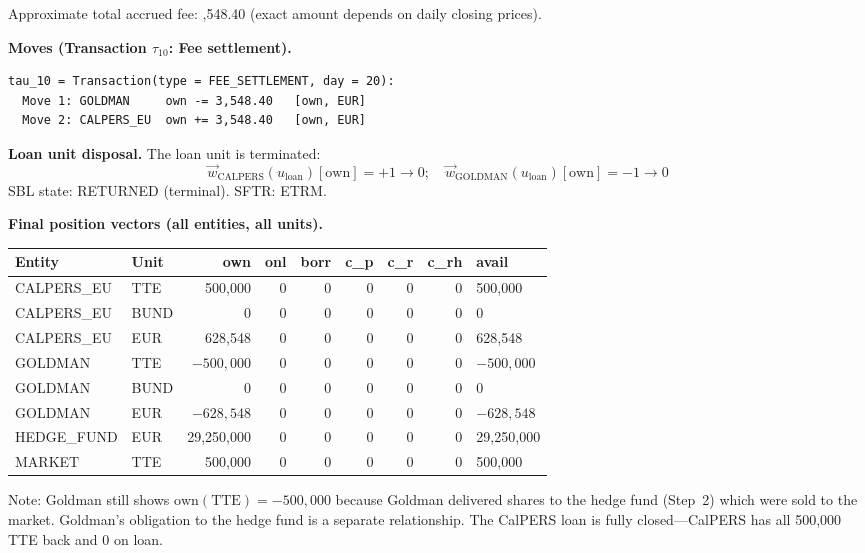 \documentclass[11pt,a4paper]{article}
\newcommand{\EUR}[1]{\texteuro#1}
\begin{document}
\noindent Approximate total accrued fee: \EUR{3,548.40} (exact amount depends on daily closing prices).

\medskip
\noindent\textbf{Moves (Transaction $\tau_{10}$: Fee settlement).}

\begin{lstlisting}
tau_10 = Transaction(type = FEE_SETTLEMENT, day = 20):
  Move 1: GOLDMAN     own -= 3,548.40   [own, EUR]
  Move 2: CALPERS_EU  own += 3,548.40   [own, EUR]
\end{lstlisting}

\noindent\textbf{Loan unit disposal.} The loan unit is terminated:
\[
\vec{w}_{\text{CALPERS}}(u_{\mathrm{loan}})[\mathrm{own}] = +1 \to 0; \quad \vec{w}_{\text{GOLDMAN}}(u_{\mathrm{loan}})[\mathrm{own}] = -1 \to 0
\]
SBL state: RETURNED (terminal). SFTR: ETRM.

\medskip
\noindent\textbf{Final position vectors (all entities, all units).}

\begin{center}\small
\begin{tabular}{l l r r r r r r l}
\toprule
\textbf{Entity} & \textbf{Unit} & own & onl & borr & c\_p & c\_r & c\_rh & avail \\
\midrule
CALPERS\_EU & TTE & 500{,}000 & 0 & 0 & 0 & 0 & 0 & 500{,}000 \\
CALPERS\_EU & BUND & 0 & 0 & 0 & 0 & 0 & 0 & 0 \\
CALPERS\_EU & EUR & 628{,}548 & 0 & 0 & 0 & 0 & 0 & 628{,}548 \\
\midrule
GOLDMAN & TTE & $-500{,}000$ & 0 & 0 & 0 & 0 & 0 & $-500{,}000$ \\
GOLDMAN & BUND & 0 & 0 & 0 & 0 & 0 & 0 & 0 \\
GOLDMAN & EUR & $-628{,}548$ & 0 & 0 & 0 & 0 & 0 & $-628{,}548$ \\
\midrule
HEDGE\_FUND & EUR & 29{,}250{,}000 & 0 & 0 & 0 & 0 & 0 & 29{,}250{,}000 \\
MARKET & TTE & 500{,}000 & 0 & 0 & 0 & 0 & 0 & 500{,}000 \\
\bottomrule
\end{tabular}
\end{center}

\noindent Note: Goldman still shows $\mathrm{own}(\text{TTE}) = -500{,}000$ because Goldman delivered shares to the hedge fund (Step~2) which were sold to the market. Goldman's obligation to the hedge fund is a separate relationship. The CalPERS loan is fully closed---CalPERS has all 500{,}000 TTE back and 0 on loan.
\end{document}
